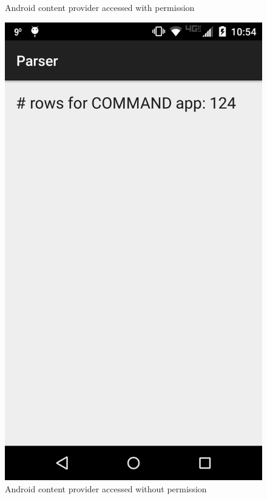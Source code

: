 \begin{figure}
\begin{minipage}{.45\columnwidth}
	\caption{Android content provider accessed with permission}
	\label{fig:bothHavePerm}
\end{minipage}
\hspace{.05\linewidth}
\begin{minipage}{.45\columnwidth}
	\includegraphics[width=\columnwidth,scale=0.5]{images/neitherHavePerm}
	\caption{Android content provider accessed without permission}
	\label{fig:neitherHavePerm}
\end{minipage}
\end{figure}
